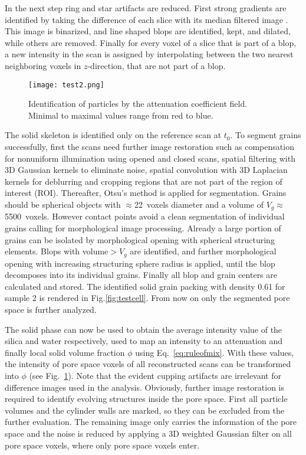 \documentclass[smallextended]{svjour3}       %
\begin{document}
In the next step ring and star artifacts are reduced. First strong gradients are identified by taking the difference of each slice with its median filtered image \cite{Prell2009}. This image is binarized, and line shaped blops are identified, kept, and dilated, while others are removed. Finally for every voxel of a slice that is part of a blop, a new intensity in the scan is assigned by interpolating between the two nearest neighboring voxels in $z$-direction, that are not part of a blop.
\begin {figure}[!hbtp]
\texttt{[image: test2.png]}
\caption{\label{fig:particalid} Identification of particles by the attenuation coefficient field. Minimal to maximal values range from red to blue.}
\end{figure}

The solid skeleton is identified only on the reference scan at $t_0$. To segment grains successfully, first the scans need further image restoration such as compensation for nonuniform illumination using opened and closed scans, spatial filtering with 3D Gaussian kernels to eliminate noise, spatial convolution with 3D Laplacian kernels for deblurring and cropping regions that are not part of the region of interest (ROI). Thereafter, Otsu's method is applied for segmentation. Grains should be spherical objects with $\approx$22~voxels diameter and a volume of $V_g\approx$5500~voxels. However contact points avoid a clean segmentation of individual grains calling for morphological image processing. Already a large portion of grains can be isolated by morphological opening with spherical structuring elements. Blops with volume$> V_g$ are identified, and further morphological opening with increasing structuring sphere radius is applied, until the blop decomposes into its individual grains. Finally all blop and grain centers are calculated and stored. The identified solid grain packing with density 0.61 for sample 2 is rendered in Fig.\ref{fig:testcell}. From now on only the segmented pore space is further analyzed.

The solid phase can now be used to obtain the average intensity value of the silica and water respectively, used to map an intensity to an attenuation and finally local solid volume fraction $\phi$ using Eq.~\ref{eq:ruleofmix}. With these values, the intensity of pore space voxels of all reconstructed scans can be transformed into $\phi$ (see Fig.~\ref{fig:particalid}). Note that the evident cupping artifacts are irrelevant for difference images used in the analysis. Obviously, further image restoration is required to identify evolving structures inside the pore space. First all particle volumes and the cylinder walls are marked, so they can be excluded from the further evaluation. The remaining image only carries the information of the pore space and the noise is reduced by applying a 3D weighted Gaussian filter on all pore space voxels, where only pore space voxels enter. 
\end{document}

